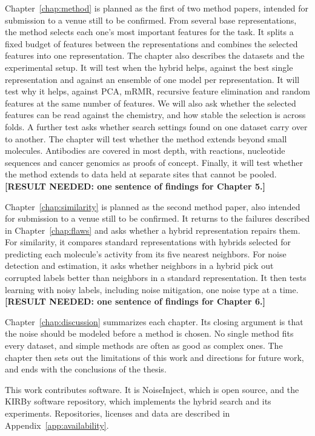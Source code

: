 Chapter~\ref{chap:method} is planned as the first of two method papers, intended for submission to a venue still to be confirmed. From several base representations, the method selects each one's most important features for the task. It splits a fixed budget of features between the representations and combines the selected features into one representation. The chapter also describes the datasets and the experimental setup. It will test when the hybrid helps, against the best single representation and against an ensemble of one model per representation. It will test why it helps, against PCA, mRMR, recursive feature elimination and random features at the same number of features. We will also ask whether the selected features can be read against the chemistry, and how stable the selection is across folds. A further test asks whether search settings found on one dataset carry over to another. The chapter will test whether the method extends beyond small molecules. Antibodies are covered in most depth, with reactions, nucleotide sequences and cancer genomics as proofs of concept. Finally, it will test whether the method extends to data held at separate sites that cannot be pooled. \textbf{[RESULT NEEDED: one sentence of findings for Chapter 5.]}

Chapter~\ref{chap:similarity} is planned as the second method paper, also intended for submission to a venue still to be confirmed. It returns to the failures described in Chapter~\ref{chap:flaws} and asks whether a hybrid representation repairs them. For similarity, it compares standard representations with hybrids selected for predicting each molecule's activity from its five nearest neighbors. For noise detection and estimation, it asks whether neighbors in a hybrid pick out corrupted labels better than neighbors in a standard representation. It then tests learning with noisy labels, including noise mitigation, one noise type at a time. \textbf{[RESULT NEEDED: one sentence of findings for Chapter 6.]}

Chapter~\ref{chap:discussion} summarizes each chapter. Its closing argument is that the noise should be modeled before a method is chosen. No single method fits every dataset, and simple methods are often as good as complex ones. The chapter then sets out the limitations of this work and directions for future work, and ends with the conclusions of the thesis. %

This work contributes software. It is NoiseInject, which is open source, and the KIRBy software repository, which implements the hybrid search and its experiments. Repositories, licenses and data are described in Appendix~\ref{app:availability}.


